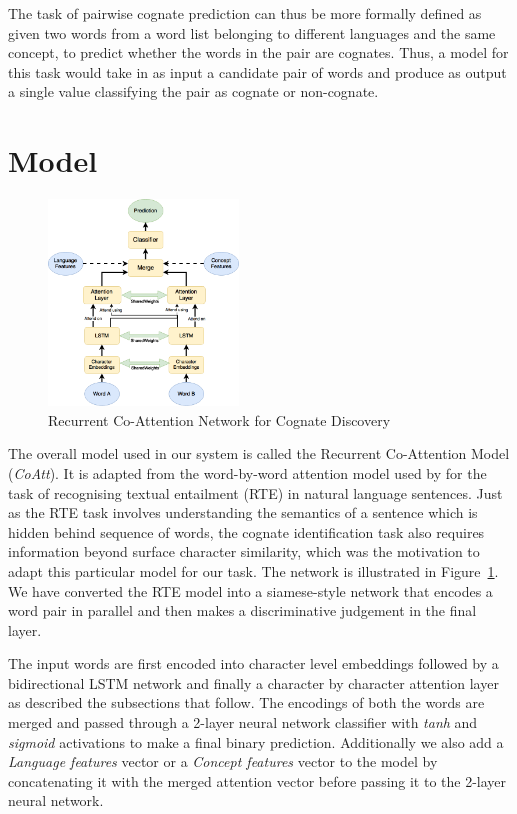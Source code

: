 \documentclass[11pt,letterpaper]{article}
\begin{document}
The task of pairwise cognate prediction can thus be more formally defined as given two words from a word list belonging to different languages and the same concept, to predict whether the words in the pair are cognates. Thus, a model for this task would take in as input a candidate pair of words and produce as output a single value classifying the pair as cognate or non-cognate. 

\section{Model}

\begin{figure}[t]
	\centering
	\includegraphics[width=0.45\textwidth]{CoAttNetwork}
    \caption{Recurrent Co-Attention Network for Cognate Discovery}
    \label{CoAttNet}
\end{figure}

The overall model used in our system is called the Recurrent Co-Attention Model (\textit{CoAtt}). It is adapted from the word-by-word attention model used by \cite{rocktaschel2016reasoning} for the task of recognising textual entailment (RTE) in natural language sentences. Just as the RTE task involves understanding the semantics of a sentence which is hidden behind sequence of words, the cognate identification task also requires information beyond surface character similarity, which was the motivation to adapt this particular model for our task. The network is illustrated in Figure~\ref{CoAttNet}. We have converted the RTE model into a siamese-style network that encodes a word pair in parallel and then makes a discriminative judgement in the final layer. 

The input words are first encoded into character level embeddings followed by a bidirectional LSTM network and finally a character by character attention layer as described the subsections that follow. The encodings of both the words are merged and passed through a 2-layer neural network classifier with \textit{tanh} and \textit{sigmoid} activations to make a final binary prediction. Additionally we also add a \textit{Language features} vector or a \textit{Concept features} vector to the model by concatenating it with the merged attention vector before passing it to the 2-layer neural network.
\end{document}
